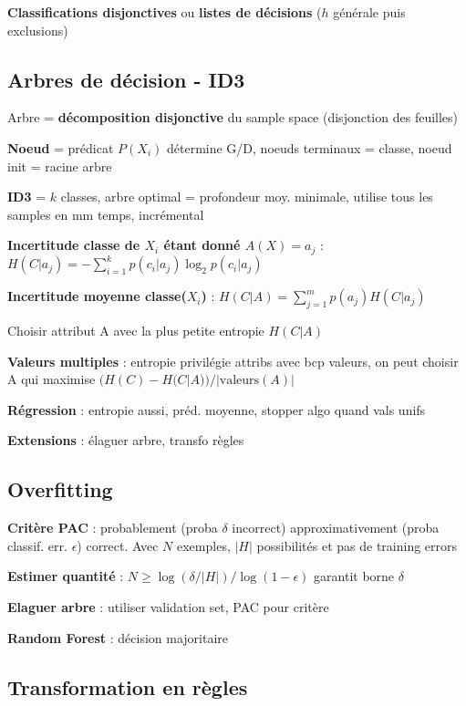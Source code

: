 \textbf{Classifications disjonctives} ou \textbf{listes de décisions} ($h$ générale puis exclusions)


\subsection*{Arbres de décision - ID3}

Arbre = \textbf{décomposition disjonctive} du sample space (disjonction des feuilles)

\textbf{Noeud} = prédicat $P(X_i)$ détermine G/D, noeuds terminaux = classe, noeud init = racine arbre

\textbf{ID3} = $k$ classes, arbre optimal = profondeur moy. minimale, utilise tous les samples en mm temps, incrémental

\textbf{Incertitude classe de $X_i$ étant donné $A(X)=a_j$} : $H(C|a_j) = -\sum_{i=1}^k p(c_i|a_j) \log_2 p(c_i|a_j)$

\textbf{Incertitude moyenne classe($X_i$)} : $H(C|A) = \sum_{j=1}^m p(a_j) H(C|a_j)$

Choisir attribut A avec la plus petite entropie $H(C|A)$


\textbf{Valeurs multiples} : entropie privilégie attribs avec bcp valeurs, on peut choisir A qui maximise $(H(C)-H(C|A))/|\text{valeurs}(A)|$

\textbf{Régression} : entropie aussi, préd. moyenne, stopper algo quand vals unifs

\textbf{Extensions} : élaguer arbre, transfo règles



\subsection*{Overfitting}

\textbf{Critère PAC} : probablement (proba $\delta$ incorrect) approximativement (proba classif. err. $\epsilon$) correct. Avec $N$ exemples, $|H|$ possibilités et pas de training errors

\textbf{Estimer quantité} : $N \geq \log(\delta/|H|)/\log(1-\epsilon)$ garantit borne $\delta$

\textbf{Elaguer arbre} : utiliser validation set, PAC pour critère

\textbf{Random Forest} : décision majoritaire


\subsection*{Transformation en règles}

